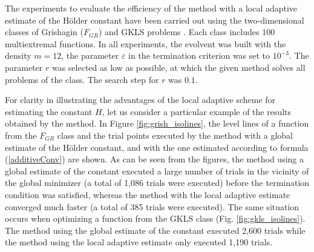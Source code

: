 \documentclass[procedia]{easychair}
\begin{document}
The experiments to evaluate the efficiency of the method with a local adaptive
estimate of the Hölder constant have been carried out using the two-dimensional
classes of Grishagin (\(F_{GR}\)) \cite{grishaginClass} and GKLS problems \cite{gklsClass}.
Each class includes 100 multiextremal functions. In all experiments, the evolvent was
built with the density \(m = 12\), the parameter \(\varepsilon\) in the termination criterion
was set to \(10^{-3}\). The parameter \(r\) was selected as low as possible, at which
the given method solves all problems of the class. The search step for \(r\) was \(0.1\).

\par
For clarity in illustrating the advantages of the local adaptive scheme for estimating
the constant \(H\), let us consider a particular example of the results obtained by the method.
In Figure \ref{fig:grish_isolines}, the level lines of a function from the \(F_{GR}\) class and
 the trial points executed by the method with a global estimate of the Hölder constant, and with
 the one estimated according to formula (\ref{additiveConv}) are shown. As can be seen from
 the figures, the method using a global estimate of the constant executed a large
 number of trials in the vicinity of the global minimizer (a total of 1,086 trials
 were executed) before the termination condition was satisfied, whereas the method
 with the local adaptive estimate converged much faster (a total of 385 trials
 were executed). The same situation occurs when optimizing a function from the
 GKLS class (Fig. \ref{fig:gkls_isolines}). The method using the global estimate of
 the constant executed 2,600 trials while the method using the local adaptive estimate only
 executed 1,190 trials.
\end{document}
